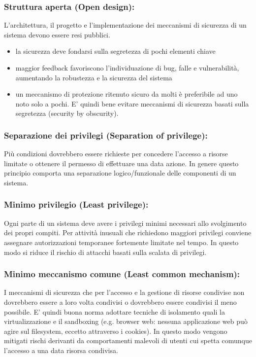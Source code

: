 \subsubsection{Struttura aperta (Open design):} \label{sec:openStruct}  L’architettura, il progetto e l'implementazione dei meccanismi di sicurezza di un sistema devono essere resi pubblici.
\begin{itemize} 
  \item la sicurezza deve fondarsi sulla segretezza di pochi elementi chiave
  \item maggior feedback favoriscono l’individuazione di bug, falle e vulnerabilità, aumentando la robustezza e la sicurezza del sistema
  \item un meccanismo di protezione ritenuto sicuro da molti è preferibile ad uno noto solo a pochi. E' quindi bene evitare meccanismi di sicurezza basati sulla segretezza (security by obscurity).
\end{itemize}


\subsubsection{Separazione dei privilegi (Separation of privilege):} Più condizioni dovrebbero essere richieste per concedere l’accesso a risorse limitate o ottenere il permesso di effettuare una data azione. In genere questo principio comporta una separazione logico/funzionale delle componenti di un sistema.

\subsubsection{Minimo privilegio (Least privilege):} Ogni parte di un sistema deve avere i privilegi minimi necessari allo svolgimento dei propri compiti. Per attività inusuali che richiedono maggiori privilegi conviene assegnare autorizzazioni temporanee fortemente limitate nel tempo. In questo modo si riduce il rischio di attacchi basati sulla scalata di privilegi.

\subsubsection{Minimo meccanismo comune (Least common mechanism):} I meccanismi di sicurezza che per l’accesso e la gestione di risorse condivise non dovrebbero essere a loro volta condivisi o dovrebbero essere condivisi il meno possibile. E' quindi buona norma adottare tecniche di isolamento quali la virtualizzazione e il sandboxing (e.g. browser web: nessuna applicazione web può agire sul filesystem, eccetto attraverso i cookies). In questo modo vengono mitigati rischi derivanti da comportamenti malevoli di utenti cui spetta comunque l’accesso a una data risorsa condivisa.

